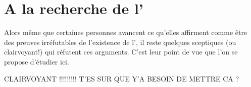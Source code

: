 \section{A la recherche de l'\op}
Alors même que certaines personnes avancent ce qu'elles affirment comme être des preuves irréfutables de l'existence de l'\op, il reste quelques sceptiques (ou clairvoyant!) qui réfutent ces arguments.
C'est leur point de vue que l'on se propose d'étudier ici.

CLAIRVOYANT !!!!!!!!! T'ES SUR QUE Y'A BESOIN DE METTRE CA ?